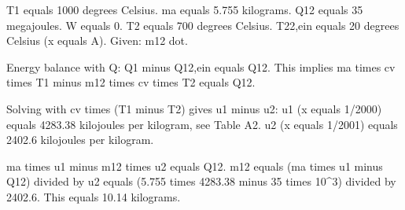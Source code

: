 T1 equals 1000 degrees Celsius.
ma equals 5.755 kilograms.
Q12 equals 35 megajoules.
W equals 0.
T2 equals 700 degrees Celsius.
T22,ein equals 20 degrees Celsius (x equals A).
Given: m12 dot.

Energy balance with Q:
Q1 minus Q12,ein equals Q12.
This implies ma times cv times T1 minus m12 times cv times T2 equals Q12.

Solving with cv times (T1 minus T2) gives u1 minus u2:
u1 (x equals 1/2000) equals 4283.38 kilojoules per kilogram, see Table A2.
u2 (x equals 1/2001) equals 2402.6 kilojoules per kilogram.

ma times u1 minus m12 times u2 equals Q12.
m12 equals (ma times u1 minus Q12) divided by u2 equals (5.755 times 4283.38 minus 35 times 10^3) divided by 2402.6.
This equals 10.14 kilograms.